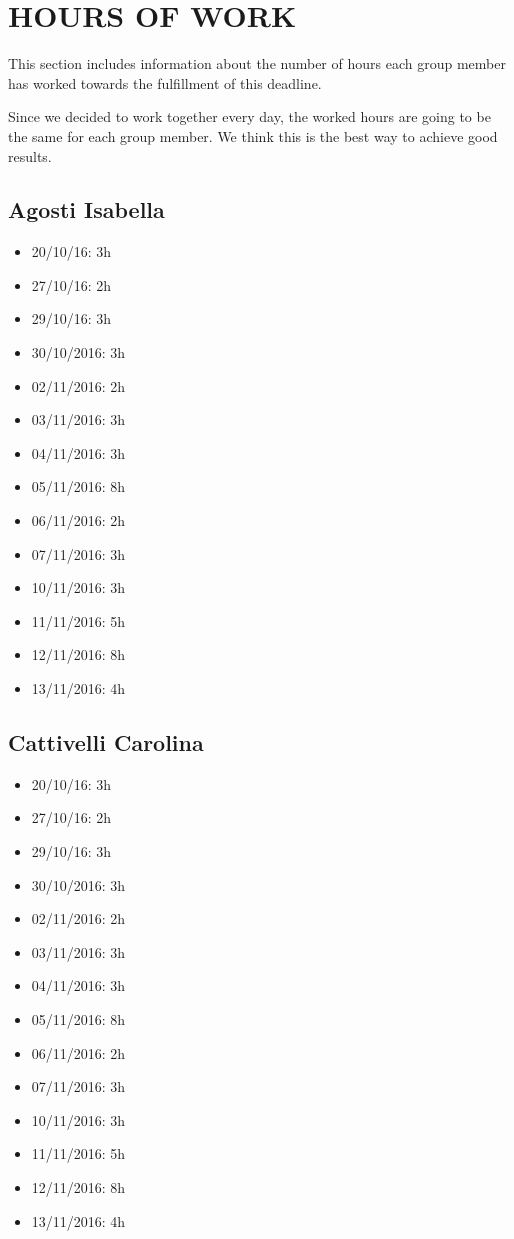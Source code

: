 \section{HOURS OF WORK}
This section includes information about the number of hours each group member has worked towards the fulfillment of this deadline. 

Since we decided to work together every day, the worked hours are going to be the same for each group member. We think this is the best way to achieve good results.  
\subsection{Agosti Isabella}
\begin{itemize}
	\item 20/10/16: 3h
	\item 27/10/16: 2h 
	\item 29/10/16: 3h
	\item 30/10/2016: 3h
	\item 02/11/2016: 2h
	\item 03/11/2016: 3h
	\item 04/11/2016: 3h
	\item 05/11/2016: 8h
	\item 06/11/2016: 2h
	\item 07/11/2016: 3h
	\item 10/11/2016: 3h
	\item 11/11/2016: 5h
	\item 12/11/2016: 8h
	\item 13/11/2016: 4h
\end{itemize}
\newpage
\subsection{Cattivelli Carolina}
\begin{itemize}
	\item 20/10/16: 3h
	\item 27/10/16: 2h
	\item 29/10/16: 3h
	\item 30/10/2016: 3h
	\item 02/11/2016: 2h
	\item 03/11/2016: 3h
	\item 04/11/2016: 3h
	\item 05/11/2016: 8h
	\item 06/11/2016: 2h
	\item 07/11/2016: 3h
	\item 10/11/2016: 3h
	\item 11/11/2016: 5h
	\item 12/11/2016: 8h
	\item 13/11/2016: 4h
\end{itemize}